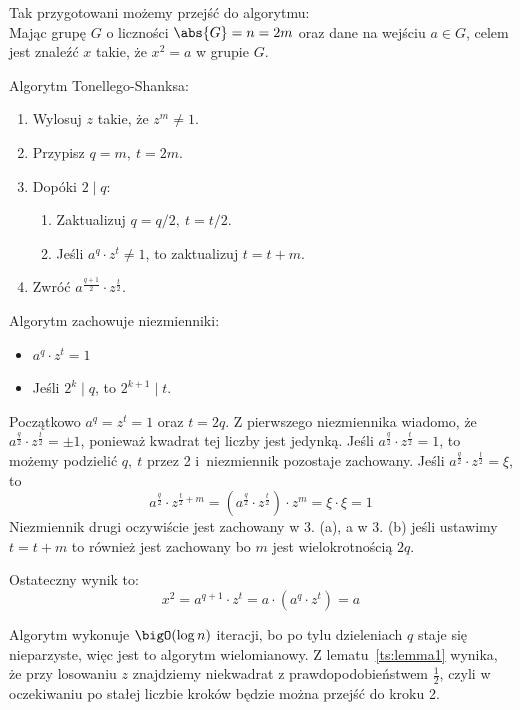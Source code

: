 Tak przygotowani możemy przejść do algorytmu: \\
Mając grupę \( G \) o liczności \( \abs{G} = n = 2m \) oraz dane na wejściu \( a \in G \), celem jest znaleźć \( x \) takie, że \( x^2 = a \) w grupie \( G \).
\begin{greyframe}
	Algorytm Tonellego-Shanksa:
	\begin{enumerate}
		\item Wylosuj \( z \) takie, że \( z^m \neq 1 \).
		\item Przypisz \( q = m, \ t = 2m \).
		\item Dopóki \( 2 \mid q \):
		      \begin{enumerate}
			      \item Zaktualizuj \( q = q / 2, \ t = t / 2 \).
			      \item Jeśli \( a^q \cdot z^t \neq 1 \), to zaktualizuj \( t = t + m \).
		      \end{enumerate}
		\item Zwróć \( a^{\frac{q+1}{2}} \cdot z^{\frac{t}{2}} \).
	\end{enumerate}
\end{greyframe}
Algorytm zachowuje niezmienniki:
\begin{itemize}
	\item \( a^q \cdot z^t = 1 \)
	\item Jeśli \( 2^k \mid q \), to \( 2^{k+1} \mid t \).
\end{itemize}
Początkowo \(a^q = z^t = 1 \) oraz \( t = 2q \).
Z pierwszego niezmiennika wiadomo, że \( a^{\frac{q}{2}} \cdot z^{\frac{t}{2}} = \pm 1 \), ponieważ kwadrat tej liczby jest jedynką.
Jeśli \( a^{\frac{q}{2}} \cdot z^{\frac{t}{2}} = 1 \), to możemy podzielić \( q, \ t \) przez 2 i~niezmiennik pozostaje zachowany.
Jeśli \( a^{\frac{q}{2}} \cdot z^{\frac{t}{2}} = \xi \), to
\[
	a^{\frac{q}{2}} \cdot z^{\frac{t}{2} + m} = (a^{\frac{q}{2}} \cdot z^{\frac{t}{2}}) \cdot z^m = \xi \cdot \xi = 1
\]
Niezmiennik drugi oczywiście jest zachowany w 3. (a), a w 3. (b) jeśli ustawimy \(t = t + m\) to również jest zachowany bo \(m\) jest wielokrotnością \(2q\).

Ostateczny wynik to:
\[
	x^2 = a^{q+1} \cdot z^t = a \cdot (a^q \cdot z^t) = a
\]

Algorytm wykonuje \( \bigO(\log n) \) iteracji, bo po tylu dzieleniach \( q \) staje się nieparzyste, więc jest to algorytm wielomianowy.
Z lematu~\ref{ts:lemma1} wynika, że przy losowaniu \( z \) znajdziemy niekwadrat z prawdopodobieństwem \( \frac{1}{2} \), czyli w oczekiwaniu po stałej liczbie kroków będzie można przejść do kroku 2.
